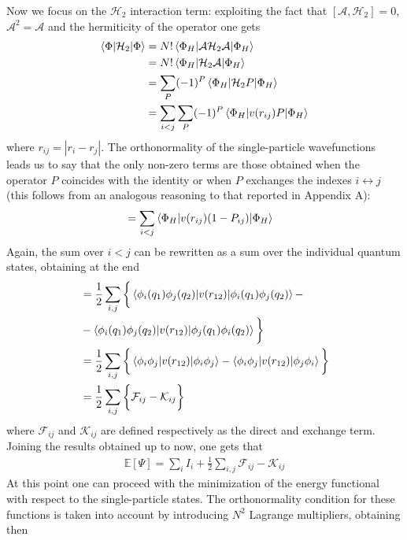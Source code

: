 Now we focus on the $\mathcal{H}_2$ interaction term: exploiting the fact that $[\mathcal{A}, \mathcal{H}_2]=0$, $\mathcal{A}^2 = \mathcal{A}$ and the hermiticity of the operator one gets
\begin{align*}
    \bracketOP{\Phi}{\Phi}{\mathcal{H}_2} &= N! \bracketOP{\Phi_H}{\Phi_H}{\mathcal{A} \mathcal{H}_2 \mathcal{A}} \\
    &= N! \bracketOP{\Phi_H}{\Phi_H}{\mathcal{H}_2 \mathcal{A}} \\
    &= \sum_P (-1)^P  \bracketOP{\Phi_H}{\Phi_H}{\mathcal{H}_2 P} \\
    &= \sum_{i<j} \sum_P (-1)^P  \bracketOP{\Phi_H}{\Phi_H}{v(r_{ij}) P}
\end{align*}
where $r_{ij}=|r_i -r_j|$. The orthonormality of the single-particle wavefunctions leads us to say that the only non-zero terms are those obtained when the operator $P$ coincides with the identity or when $P$ exchanges the indexes $i \leftrightarrow j$ (this follows from an analogous reasoning to that reported in Appendix A):   
\begin{align*}
    &= \sum_{i<j} \bracketOP{\Phi_H}{\Phi_H}{v(r_{ij})(1-P_{ij})}
\end{align*}
Again, the sum over $i<j$ can be rewritten as a sum over the individual quantum states, obtaining at the end
\begin{align*}
    &= \frac{1}{2} \sum_{i,j} \bigg\{ \bracketOP{\phi_i (q_1) \phi_j(q_2)}{\phi_i (q_1) \phi_j (q_2)}{v(r_{12})} - \\
    & - \bracketOP{\phi_i (q_1) \phi_j(q_2)}{\phi_j (q_1) \phi_i (q_2)}{v(r_{12})} \bigg\} \\
    &= \frac{1}{2} \sum_{i,j} \bigg\{ \bracketOP{\phi_i \phi_j}{\phi_i \phi_j }{v(r_{12})} - \bracketOP{\phi_i \phi_j}{\phi_j \phi_i }{v(r_{12})} \bigg\} \\
    &= \frac{1}{2} \sum_{i,j} \bigg\{ \mathcal{F}_{ij} - \mathcal{K}_{ij} \bigg\}
\end{align*}
where $\mathcal{F}_{ij}$ and $\mathcal{K}_{ij}$ are defined respectively as the direct and exchange term. Joining the results obtained up to now, one gets that
\begin{align}
    \mathbb{E}[\Psi] = \sum_i I_i + \frac{1}{2} \sum_{i,j} \mathcal{F}_{ij} - \mathcal{K}_{ij}
    \label{eq:expected_val_energy}
\end{align}
At this point one can proceed with the minimization of the energy functional with respect to the single-particle states. The orthonormality condition for these functions is taken into account by introducing $N^2$ Lagrange multipliers, obtaining then
